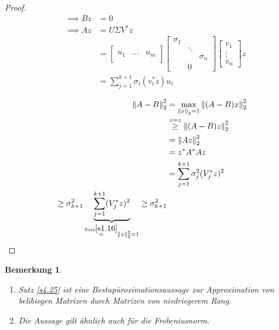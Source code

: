 \documentclass{book}
\newtheorem{remark}[algorithm]{Bemerkung}
\begin{document}
\begin{proof}
            \begin{align*}
                &\implies Bz &=0\\
                &\implies Az&=U\Sigma V^* z\\
                &&=\begin{bmatrix}
                    &&\\
                    u_1 & \dots & u_m\\
                    &&
                \end{bmatrix}
                \begin{bmatrix}
                    \sigma_1 && \\
                    & \ddots &\\
                    &&\sigma_n \\
                    &0&
                \end{bmatrix}
                \begin{bmatrix}
                    v_1\\
                    \vdots \\
                    v_n
                \end{bmatrix}z \\
                &&= \sum_{j=1}^{k+1}\sigma_i(v_i^*z)u_i
            \end{align*}

            \begin{align*}
                \left\Vert A-B \right\Vert_2^2 &= \max_{\left\Vert x \right\Vert_2=1} \left\Vert (A-B)x \right\Vert_2^2 \\
                &\stackrel{x=z}{\geq} \left\Vert (A-B)z \right\Vert_2^2 \\
                &= \left\Vert Az \right\Vert_2^2\\
                &=z^* A^* A z\\
                &=\sum_{j=1}^{k+1}\sigma_j^2 (V_j^*z)^2 \\
                \geq \sigma_{k+1}^2 \underbrace{\sum_{j=1}^{k+1} (V_j^*z)^2}_{\stackrel{\text{Satz} \ref{s1.16}}{=}\left\Vert z \right\Vert_2^2=1}\geq \sigma_{k+1}^2
            \end{align*}

            \end{proof}

            \begin{remark}\label{4.26}
                \begin{enumerate}
                    \item Satz \ref*{s4.25} ist eine Bestapüroximationsaussage zur Approximation von belibiegen Matrizen durch Matrizen von niedriegerem Rang.
                    \item Die Aussage gilt ähnlich auch für die Frobeniusnorm.
                \end{enumerate}
            \end{remark}
\end{document}

